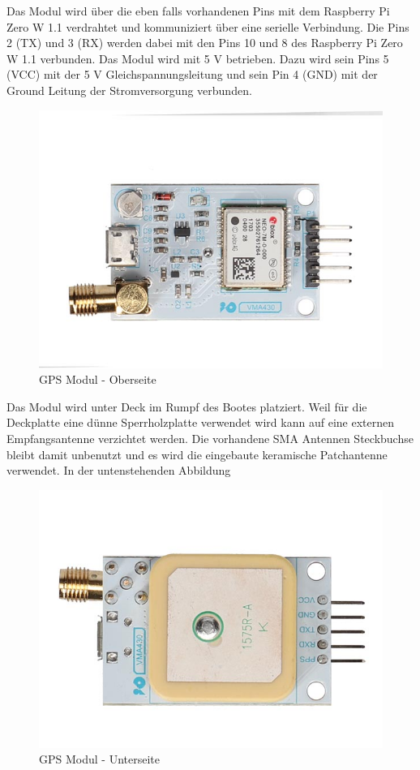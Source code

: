 Das Modul wird über die eben falls vorhandenen Pins mit dem Raspberry Pi Zero W 1.1 verdrahtet und  kommuniziert über eine serielle Verbindung. Die Pins 2 (TX) und 3 (RX) werden dabei mit den Pins 10 und 8 des Raspberry Pi Zero W 1.1 verbunden. Das Modul wird mit 5 V betrieben. Dazu wird sein Pins 5 (VCC) mit der 5 V Gleichspannungsleitung und sein Pin 4 (GND) mit der Ground Leitung der Stromversorgung verbunden.   
\begin{figure}[H]
    \centering
    \includegraphics[width=0.75\linewidth]{vma430_front-1.jpg}
    \caption{GPS Modul - Oberseite}
    \label{fig:enter-label}
\end{figure}
Das Modul wird unter Deck im Rumpf des Bootes platziert. Weil für die Deckplatte eine dünne Sperrholzplatte verwendet wird kann auf eine externen Empfangsantenne verzichtet werden. Die vorhandene SMA Antennen Steckbuchse bleibt damit unbenutzt und es wird die eingebaute keramische Patchantenne verwendet. In der untenstehenden Abbildung \href{}{}

\begin{figure}[H]
    \centering
    \includegraphics[width=0.75\linewidth]{vma430_back-1.jpg}
    \caption{GPS Modul - Unterseite}
    \label{fig:enter-label}
\end{figure}


